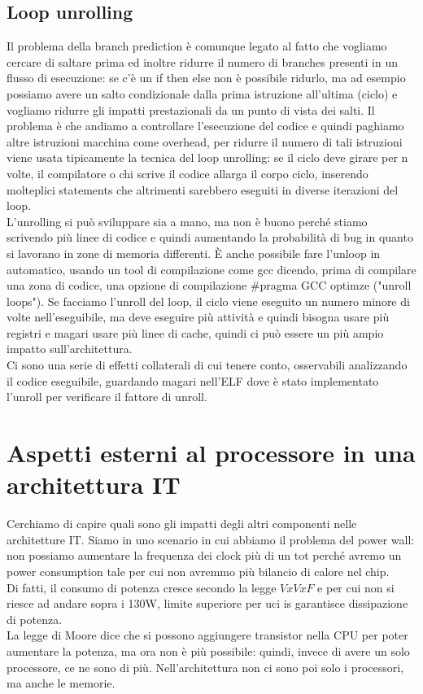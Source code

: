 \documentclass[12pt, oneside]{extbook}
\begin{document}
\subsection{Loop unrolling}
Il problema della branch prediction è comunque legato al fatto che vogliamo cercare di saltare prima ed inoltre ridurre il numero di branches presenti in un flusso di esecuzione: se c'è un if then else non è possibile ridurlo, ma ad esempio possiamo avere un salto condizionale dalla prima istruzione all'ultima (ciclo) e vogliamo ridurre gli impatti prestazionali da un punto di vista dei salti. Il problema è che andiamo a controllare l'esecuzione del codice e quindi paghiamo altre istruzioni macchina come overhead, per ridurre il numero di tali istruzioni viene usata tipicamente la tecnica del loop unrolling: se il ciclo deve girare per n volte, il compilatore o chi scrive il codice allarga il corpo ciclo, inserendo molteplici statements che altrimenti sarebbero eseguiti in diverse iterazioni del loop.\\
L'unrolling si può sviluppare sia a mano, ma non è buono perché stiamo scrivendo più linee di codice e quindi aumentando la probabilità di bug in quanto si lavorano in zone di memoria differenti. È anche possibile fare l'unloop in automatico, usando un tool di compilazione come gcc dicendo, prima di compilare una zona di codice, una opzione di compilazione \textsf{\#pragma GCC optimze ("unroll loops")}. Se facciamo l'unroll del loop, il ciclo viene eseguito un numero minore di volte nell'eseguibile, ma deve eseguire più attività e quindi bisogna usare più registri e magari usare più linee di cache, quindi ci può essere un più ampio impatto sull'architettura.\\ Ci sono una serie di effetti collaterali di cui tenere conto, osservabili analizzando il codice eseguibile, guardando magari nell'ELF dove è stato implementato l'unroll per verificare il fattore di unroll.
\section{Aspetti esterni al processore in una architettura IT}
Cerchiamo di capire quali sono gli impatti degli altri componenti nelle architetture IT. Siamo in uno scenario in cui abbiamo il problema del power wall: non possiamo aumentare la frequenza dei clock più di un tot perché avremo un power consumption tale per cui non avremmo più bilancio di calore nel chip.\\ Di fatti, il consumo di potenza cresce secondo la legge $VxVxF$ e per cui non si riesce ad andare sopra i 130W, limite superiore per uci is garantisce dissipazione di potenza.\\ La legge di Moore dice che si possono aggiungere transistor nella CPU per poter aumentare la potenza, ma ora non è più possibile: quindi, invece di avere un solo processore, ce ne sono di più. Nell'architettura non ci sono poi solo i processori, ma anche le memorie.
\end{document}
